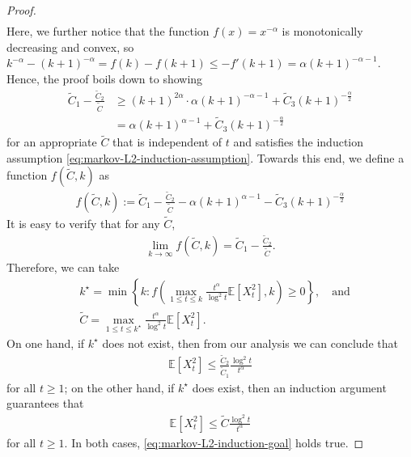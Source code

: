 \begin{proof}
\begin{align*}
\end{align*}
Here, we further notice that the function $f(x) = x^{-\alpha}$ is monotonically decreasing and convex, so $k^{-\alpha}-(k+1)^{-\alpha} = f(k) -f(k+1) \leq -f'(k+1) = \alpha(k+1)^{-\alpha-1}$. Hence, the proof boils down to showing
\begin{align*}
\widetilde{C}_1 - \frac{\widetilde{C}_2}{\widetilde{C}} &\geq (k+1)^{2\alpha}\cdot \alpha(k+1)^{-\alpha-1} + \widetilde{C}_3 (k+1)^{-\frac{\alpha}{2}} \\ 
&= \alpha(k+1)^{\alpha-1} + \widetilde{C}_3 (k+1)^{-\frac{\alpha}{2}}
\end{align*}
for an appropriate $\widetilde{C}$ that is independent of $t$ and satisfies the induction assumption \eqref{eq:markov-L2-induction-assumption}. 
Towards this end, we define a function $f(\widetilde{C},k)$ as
\begin{align*}
f(\widetilde{C}, k):= \widetilde{C}_1 - \frac{\widetilde{C}_2}{\widetilde{C}} - \alpha(k+1)^{\alpha-1}- \widetilde{C}_3 (k+1)^{-\frac{\alpha}{2}}
\end{align*}
It is easy to verify that for any $\widetilde{C}$,
\begin{align*}
\lim_{k \to \infty} f(\widetilde{C}, k) = \widetilde{C}_1 - \frac{\widetilde{C}_2}{\widetilde{C}}.
\end{align*}
Therefore, we can take 
\begin{align*}
&k^\star = \min\left\{k:f\left(\max_{1 \leq t \leq k} \frac{t^\alpha}{\log^2 t} \mathbb{E}[X_t^2], k\right) \geq 0 \right\}, \quad \text{and} \\
&\widetilde{C} = \max_{1 \leq t \leq k^\star} \frac{t^\alpha}{\log^2 t} \mathbb{E}[X_t^2].
\end{align*}
On one hand, if $k^\star$ does not exist, then from our analysis we can conclude that 
\begin{align*}
\mathbb{E}[X_t^2] \leq \frac{\widetilde{C}_2}{\widetilde{C}_1} \frac{\log^2 t}{t^{\alpha}}
\end{align*}
for all $t \geq 1$; on the other hand, if $k^\star$ does exist, then an induction argument guarantees that
\begin{align*}
\mathbb{E}[X_t^2] \leq \widetilde{C} \frac{\log^2 t}{t^{\alpha}}
\end{align*}
for all $t \geq 1$. In both cases, \eqref{eq:markov-L2-induction-goal} holds true. 

\end{proof}
